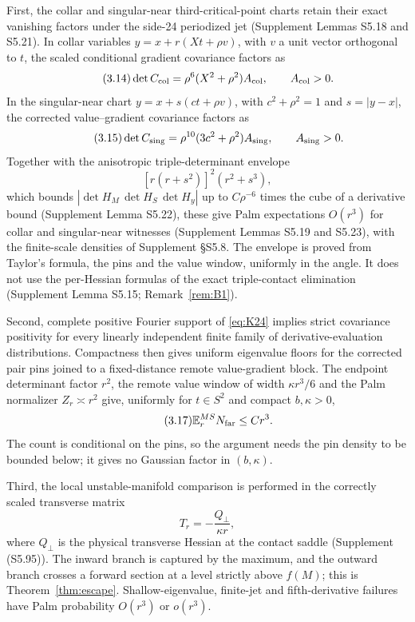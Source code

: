 First, the collar and singular-near third-critical-point charts retain their exact vanishing factors under the side-24 periodized jet (Supplement Lemmas S5.18 and S5.21). In collar variables $y=x+r(Xt+\rho v)$, with $v$ a unit vector orthogonal to $t$, the scaled conditional gradient covariance factors as
\begin{equation}\tag{3.14}
\det C_{\rm col}=\rho^6(X^2+\rho^2)A_{\rm col},\qquad A_{\rm col}>0 .
\end{equation}
In the singular-near chart $y=x+s(ct+\rho v)$, with $c^2+\rho^2=1$ and $s=|y-x|$, the corrected value--gradient covariance factors as
\begin{equation}\tag{3.15}
\det C_{\rm sing}=\rho^{10}(3c^2+\rho^2)A_{\rm sing},\qquad A_{\rm sing}>0 .
\end{equation}
Together with the anisotropic triple-determinant envelope
\begin{equation}\tag{3.16}
[r(r+s^2)]^2(r^2+s^3),
\end{equation}
which bounds $|\det H_M\,\det H_S\,\det H_y|$ up to $C\rho^{-6}$ times the cube of a derivative bound (Supplement Lemma S5.22), these give Palm expectations $O(r^3)$ for collar and singular-near witnesses (Supplement Lemmas S5.19 and S5.23), with the finite-scale densities of Supplement \S S5.8. The envelope is proved from Taylor's formula, the pins and the value window, uniformly in the angle. It does not use the per-Hessian formulas of the exact triple-contact elimination (Supplement Lemma S5.15; Remark~\ref{rem:B1}).

Second, complete positive Fourier support of \eqref{eq:K24} implies strict covariance positivity for every linearly independent finite family of derivative-evaluation distributions. Compactness then gives uniform eigenvalue floors for the corrected pair pins joined to a fixed-distance remote value-gradient block. The endpoint determinant factor $r^2$, the remote value window of width $\kappa r^3/6$ and the Palm normalizer $Z_r\asymp r^2$ give, uniformly for $t\in S^2$ and compact $b,\kappa>0$,
\begin{equation}\tag{3.17}
\mathbb E_r^{MS}N_{\rm far}\le Cr^3 .
\end{equation}
The count is conditional on the pins, so the argument needs the pin density to be bounded below; it gives no Gaussian factor in $(b,\kappa)$.

Third, the local unstable-manifold comparison is performed in the correctly scaled transverse matrix
\begin{equation}\tag{3.18}\label{eq:Tr}
T_r=-\frac{Q_\perp}{\kappa r},
\end{equation}
where $Q_\perp$ is the physical transverse Hessian at the contact saddle (Supplement (S5.95)). The inward branch is captured by the maximum, and the outward branch crosses a forward section at a level strictly above $f(M)$; this is Theorem~\ref{thm:escape}. Shallow-eigenvalue, finite-jet and fifth-derivative failures have Palm probability $O(r^3)$ or $o(r^3)$.

